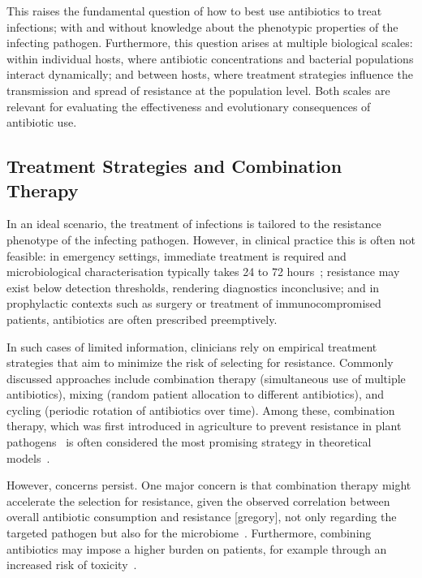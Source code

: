 \documentclass[../main.tex]{subfiles}
\begin{document}
This raises the fundamental question of how to best use antibiotics to treat infections; with and without knowledge about the phenotypic properties of the infecting pathogen.
Furthermore, this question arises at multiple biological scales: within individual hosts, where antibiotic concentrations and bacterial populations interact dynamically; and between hosts, where treatment strategies influence the transmission and spread of resistance at the population level.
Both scales are relevant for evaluating the effectiveness and evolutionary consequences of antibiotic use.

\subsection{Treatment Strategies and Combination Therapy}
In an ideal scenario, the treatment of infections is tailored to the resistance phenotype of the infecting pathogen.
However, in clinical practice this is often not feasible: in emergency settings, immediate treatment is required and microbiological characterisation typically takes 24 to 72 hours~\cite{Leekha2011}; resistance may exist below detection thresholds, rendering diagnostics inconclusive; and in prophylactic contexts such as surgery or treatment of immunocompromised patients, antibiotics are often prescribed preemptively.

In such cases of limited information, clinicians rely on empirical treatment strategies that aim to minimize the risk of selecting for resistance.
Commonly discussed approaches include combination therapy (simultaneous use of multiple antibiotics), mixing (random patient allocation to different antibiotics), and cycling (periodic rotation of antibiotics over time).
Among these, combination therapy, which was first introduced in agriculture to prevent resistance in plant pathogens~\cite{Kable1980, Delp1980, Skylakakis1981} is often considered the most promising strategy in theoretical models~\cite{Bonhoeffer1997, Tepekule2017,Uecker2021}.

However, concerns persist.
One major concern is that combination therapy might accelerate the selection for resistance, given the observed correlation between overall antibiotic consumption and resistance [gregory], not only regarding the targeted pathogen but also for the microbiome~\cite{...}.
Furthermore, combining antibiotics may impose a higher burden on patients, for example through an increased risk of toxicity~\cite{Tamma2012}.
\end{document}
